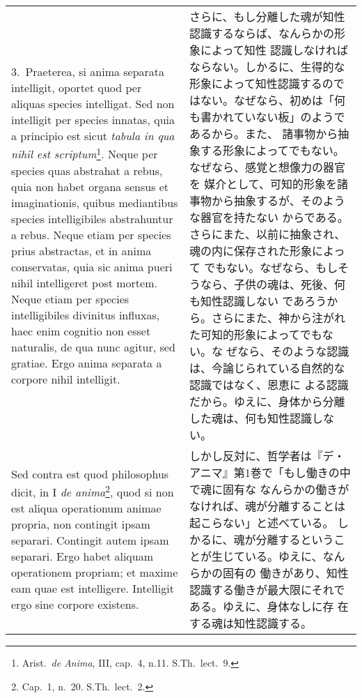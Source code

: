 \documentclass[10pt]{jsarticle} %
\begin{document}
\begin{longtable}{p{21em}p{21em}}
\\



3.~{\sc Praeterea}, si anima separata intelligit, oportet quod per
aliquas species intelligat. Sed non intelligit per species innatas,
quia a principio est sicut {\it tabula in qua nihil est
scriptum}\footnote{Arist.~{\it de Anima}, III, cap.~4,
n.11. S.Th.~lect.~9.  }. Neque per species quas abstrahat a rebus,
quia non habet organa sensus et imaginationis, quibus mediantibus
species intelligibiles abstrahuntur a rebus. Neque etiam per species
prius abstractas, et in anima conservatas, quia sic anima pueri nihil
intelligeret post mortem. Neque etiam per species intelligibiles
divinitus influxas, haec enim cognitio non esset naturalis, de qua
nunc agitur, sed gratiae. Ergo anima separata a corpore nihil
intelligit.


&

さらに、もし分離した魂が知性認識するならば、なんらかの形象によって知性
認識しなければならない。しかるに、生得的な形象によって知性認識するので
はない。なぜなら、初めは「何も書かれていない板」のようであるから。また、
諸事物から抽象する形象によってでもない。なぜなら、感覚と想像力の器官を
媒介として、可知的形象を諸事物から抽象するが、そのような器官を持たない
からである。さらにまた、以前に抽象され、魂の内に保存された形象によって
でもない。なぜなら、もしそうなら、子供の魂は、死後、何も知性認識しない
であろうから。さらにまた、神から注がれた可知的形象によってでもない。な
ぜなら、そのような認識は、今論じられている自然的な認識ではなく、恩恵に
よる認識だから。ゆえに、身体から分離した魂は、何も知性認識しない。

\\



{\sc Sed contra est quod} philosophus dicit, in I {\it de
anima}\footnote{Cap.~1, n.~20. S.Th.~lect.~2.}, quod si non est aliqua
operationum animae propria, non contingit ipsam separari. Contingit
autem ipsam separari. Ergo habet aliquam operationem propriam; et
maxime eam quae est intelligere. Intelligit ergo sine corpore
existens.


&

しかし反対に、哲学者は『デ・アニマ』第1巻で「もし働きの中で魂に固有な
なんらかの働きがなければ、魂が分離することは起こらない」と述べている。
しかるに、魂が分離するということが生じている。ゆえに、なんらかの固有の
働きがあり、知性認識する働きが最大限にそれである。ゆえに、身体なしに存
在する魂は知性認識する。


\\



\end{longtable}
\end{document}
